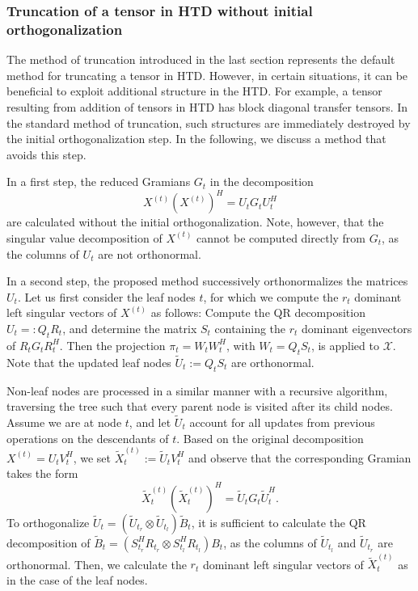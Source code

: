 \documentclass[11pt, a4paper]{article}
\newcommand{\calX}{\mathcal{X}}
\renewcommand{\tilde}{\widetilde}
\begin{document}
\subsubsection{Truncation of a tensor in HTD without initial orthogonalization} \label{sec:trunc_var}
%

The method of truncation introduced in the last section represents the
default method for truncating a tensor in HTD.  However, in certain
situations, it can be beneficial to exploit additional structure in
the HTD. For example, a tensor resulting from addition of tensors in
HTD has block diagonal transfer tensors. In the standard method of
truncation, such structures are immediately destroyed by the initial
orthogonalization step. In the following, we discuss a method that
avoids this step.

In a first step, the reduced Gramians $G_t$ in the decomposition
\[
X^{(t)} (X^{(t)})^H = U_t G_t U_t^H
\]
are calculated without the initial orthogonalization.
Note, however, that the singular value decomposition of $X^{(t)}$ 
cannot be computed directly from $G_t$,
as the columns of $U_t$ are not orthonormal.

In a second step,
the proposed method successively orthonormalizes the matrices $U_t$.
Let us first consider the leaf nodes $t$, for which
we compute the $r_t$ dominant left 
singular vectors of $X^{(t)}$ as follows: 
Compute the QR decomposition $U_t =: Q_t R_t$, 
and
determine the matrix $S_t$ containing the
$r_t$ dominant eigenvectors of $R_t G_t R_t^H$.
Then the projection $\pi_t = W_t W_t^H$, 
with $W_t = Q_t S_t$, 
is applied to $\calX$.
Note that the updated leaf nodes $\tilde{U}_t:=Q_t S_t$
are orthonormal.

Non-leaf nodes are processed in a similar manner with 
a recursive algorithm,
traversing the tree
such that every parent node is visited
after its child nodes.
Assume we are at node $t$, and let 
$\tilde{U}_t$ account for all updates from previous operations on the descendants of $t$.
Based on the original decomposition $X^{(t)} = U_t V_t^H$, we set
$\tilde{X}_t^{(t)} := 
\tilde{U}_t V_t^H$ and observe that the corresponding Gramian takes the form
\[
\tilde{X}_t^{(t)} (\tilde{X}_t^{(t)})^H = 
\tilde{U}_t G_t \tilde{U}_t^H.
\]
To orthogonalize $\tilde{U}_t = (\tilde{U}_{t_r} \otimes \tilde{U}_{t_l}) \tilde{B}_t$,
it is sufficient to calculate the QR decomposition of
$\tilde{B}_t = (S_{t_r}^H R_{t_r} \otimes S_{t_l}^H R_{t_l}) B_t$, as the columns of $\tilde{U}_{t_l}$ and $\tilde{U}_{t_r}$ are
orthonormal. Then, we calculate the $r_t$ dominant left singular vectors
of $\tilde{X}_t^{(t)}$ as in the case of the leaf nodes.
\end{document}
